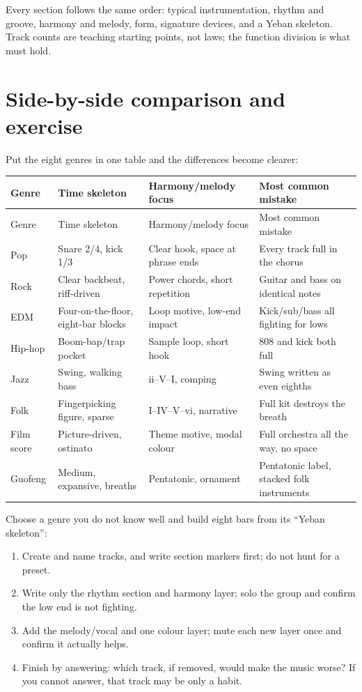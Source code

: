 Every section follows the same order: typical instrumentation, rhythm and groove, harmony and melody, form, signature devices, and a Yeban skeleton. Track counts are teaching starting points, not laws; the function division is what must hold.


\section{Side-by-side comparison and exercise}
\label{sec:genres-compare}

Put the eight genres in one table and the differences become clearer:

\begin{longtable}{p{}p{}p{}p{}}
\toprule
Genre & Time skeleton & Harmony/melody focus & Most common mistake \\
\midrule
\endfirsthead
\toprule
Genre & Time skeleton & Harmony/melody focus & Most common mistake \\
\midrule
\endhead
Pop & Snare 2/4, kick 1/3 & Clear hook, space at phrase ends & Every track full in the chorus \\
Rock & Clear backbeat, riff-driven & Power chords, short repetition & Guitar and bass on identical notes \\
EDM & Four-on-the-floor, eight-bar blocks & Loop motive, low-end impact & Kick/sub/bass all fighting for lows \\
Hip-hop & Boom-bap/trap pocket & Sample loop, short hook & 808 and kick both full \\
Jazz & Swing, walking bass & ii--V--I, comping & Swing written as even eighths \\
Folk & Fingerpicking figure, sparse & I--IV--V--vi, narrative & Full kit destroys the breath \\
Film score & Picture-driven, ostinato & Theme motive, modal colour & Full orchestra all the way, no space \\
Guofeng & Medium, expansive, breaths & Pentatonic, ornament & Pentatonic label, stacked folk instruments \\
\bottomrule
\end{longtable}

\begin{exercise}
Choose a genre you do not know well and build eight bars from its ``Yeban skeleton'':
\begin{enumerate}
\item Create and name tracks, and write section markers first; do not hunt for a preset.
\item Write only the rhythm section and harmony layer; solo the group and confirm the low end is not fighting.
\item Add the melody/vocal and one colour layer; mute each new layer once and confirm it actually helps.
\item Finish by answering: which track, if removed, would make the music worse? If you cannot answer, that track may be only a habit.
\end{enumerate}
\end{exercise}

